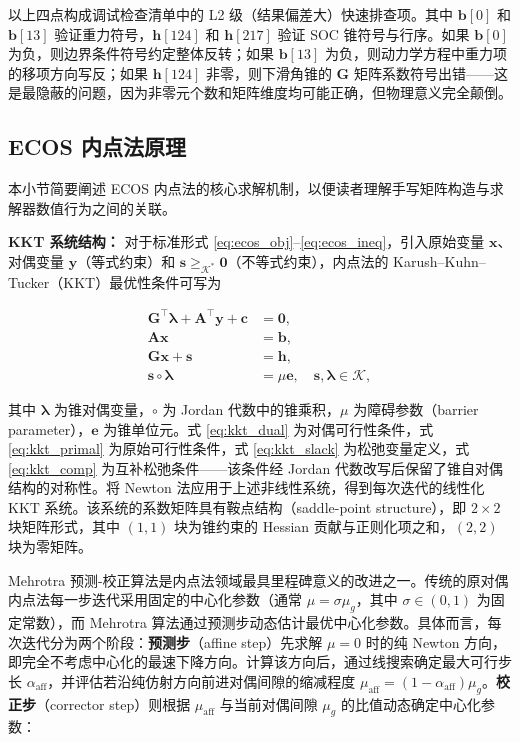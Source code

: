 以上四点构成调试检查清单中的 L2 级（结果偏差大）快速排查项。其中 $\bm{b}[0]$ 和 $\bm{b}[13]$ 验证重力符号，$\bm{h}[124]$ 和 $\bm{h}[217]$ 验证 SOC 锥符号与行序。如果 $\bm{b}[0]$ 为负，则边界条件符号约定整体反转；如果 $\bm{b}[13]$ 为负，则动力学方程中重力项的移项方向写反；如果 $\bm{h}[124]$ 非零，则下滑角锥的 $\bm{G}$ 矩阵系数符号出错——这是最隐蔽的问题，因为非零元个数和矩阵维度均可能正确，但物理意义完全颠倒。

\subsection{ECOS 内点法原理}

本小节简要阐述 ECOS 内点法的核心求解机制，以便读者理解手写矩阵构造与求解器数值行为之间的关联。

\textbf{KKT 系统结构：} 对于标准形式 \eqref{eq:ecos_obj}--\eqref{eq:ecos_ineq}，引入原始变量 $\bm{x}$、对偶变量 $\bm{y}$（等式约束）和 $\bm{s} \geq_{\mathcal{K}^*} \bm{0}$（不等式约束），内点法的 Karush--Kuhn--Tucker（KKT）最优性条件可写为

\begin{align}
\bm{G}^{\top}\bm{\lambda} + \bm{A}^{\top}\bm{y} + \bm{c} &= \bm{0}, \label{eq:kkt_dual} \\
\bm{A}\bm{x} &= \bm{b}, \label{eq:kkt_primal} \\
\bm{G}\bm{x} + \bm{s} &= \bm{h}, \label{eq:kkt_slack} \\
\bm{s} \circ \bm{\lambda} &= \mu \bm{e}, \quad \bm{s}, \bm{\lambda} \in \mathcal{K}, \label{eq:kkt_comp}
\end{align}

其中 $\bm{\lambda}$ 为锥对偶变量，$\circ$ 为 Jordan 代数中的锥乘积，$\mu$ 为障碍参数（barrier parameter），$\bm{e}$ 为锥单位元。式 \eqref{eq:kkt_dual} 为对偶可行性条件，式 \eqref{eq:kkt_primal} 为原始可行性条件，式 \eqref{eq:kkt_slack} 为松弛变量定义，式 \eqref{eq:kkt_comp} 为互补松弛条件——该条件经 Jordan 代数改写后保留了锥自对偶结构的对称性。将 Newton 法应用于上述非线性系统，得到每次迭代的线性化 KKT 系统。该系统的系数矩阵具有鞍点结构（saddle-point structure），即 $2\times 2$ 块矩阵形式，其中 $(1,1)$ 块为锥约束的 Hessian 贡献与正则化项之和，$(2,2)$ 块为零矩阵。

Mehrotra 预测-校正算法是内点法领域最具里程碑意义的改进之一。传统的原对偶内点法每一步迭代采用固定的中心化参数（通常 $\mu = \sigma \mu_g$，其中 $\sigma \in (0,1)$ 为固定常数），而 Mehrotra 算法通过预测步动态估计最优中心化参数。具体而言，每次迭代分为两个阶段：\textbf{预测步}（affine step）先求解 $\mu = 0$ 时的纯 Newton 方向，即完全不考虑中心化的最速下降方向。计算该方向后，通过线搜索确定最大可行步长 $\alpha_{\text{aff}}$，并评估若沿纯仿射方向前进对偶间隙的缩减程度 $\mu_{\text{aff}} = (1 - \alpha_{\text{aff}})\mu_g$。\textbf{校正步}（corrector step）则根据 $\mu_{\text{aff}}$ 与当前对偶间隙 $\mu_g$ 的比值动态确定中心化参数：

